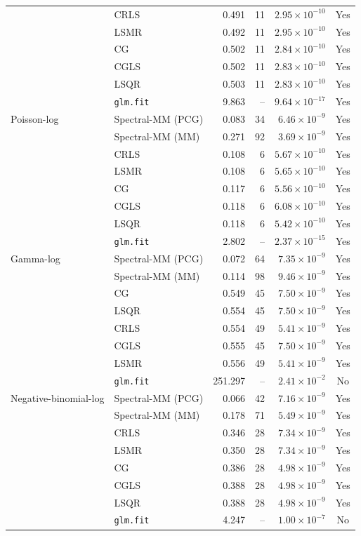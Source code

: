 \documentclass[10pt,a4paper]{article}
\begin{document}
\begin{longtable}{llrrrc}
 & CRLS & 0.491 & 11 & $2.95\times10^{-10}$ & Yes \\
 & LSMR & 0.492 & 11 & $2.95\times10^{-10}$ & Yes \\
 & CG & 0.502 & 11 & $2.84\times10^{-10}$ & Yes \\
 & CGLS & 0.502 & 11 & $2.83\times10^{-10}$ & Yes \\
 & LSQR & 0.503 & 11 & $2.83\times10^{-10}$ & Yes \\
 & \texttt{glm.fit} & 9.863 & -- & $9.64\times10^{-17}$ & Yes \\
\midrule
Poisson-log & Spectral-MM (PCG) & 0.083 & 34 & $6.46\times10^{-9}$ & Yes \\
 & Spectral-MM (MM) & 0.271 & 92 & $3.69\times10^{-9}$ & Yes \\
 & CRLS & 0.108 & 6 & $5.67\times10^{-10}$ & Yes \\
 & LSMR & 0.108 & 6 & $5.65\times10^{-10}$ & Yes \\
 & CG & 0.117 & 6 & $5.56\times10^{-10}$ & Yes \\
 & CGLS & 0.118 & 6 & $6.08\times10^{-10}$ & Yes \\
 & LSQR & 0.118 & 6 & $5.42\times10^{-10}$ & Yes \\
 & \texttt{glm.fit} & 2.802 & -- & $2.37\times10^{-15}$ & Yes \\
\midrule
Gamma-log & Spectral-MM (PCG) & 0.072 & 64 & $7.35\times10^{-9}$ & Yes \\
 & Spectral-MM (MM) & 0.114 & 98 & $9.46\times10^{-9}$ & Yes \\
 & CG & 0.549 & 45 & $7.50\times10^{-9}$ & Yes \\
 & LSQR & 0.554 & 45 & $7.50\times10^{-9}$ & Yes \\
 & CRLS & 0.554 & 49 & $5.41\times10^{-9}$ & Yes \\
 & CGLS & 0.555 & 45 & $7.50\times10^{-9}$ & Yes \\
 & LSMR & 0.556 & 49 & $5.41\times10^{-9}$ & Yes \\
 & \texttt{glm.fit} & 251.297 & -- & $2.41\times10^{-2}$ & No \\
\midrule
Negative-binomial-log & Spectral-MM (PCG) & 0.066 & 42 & $7.16\times10^{-9}$ & Yes \\
 & Spectral-MM (MM) & 0.178 & 71 & $5.49\times10^{-9}$ & Yes \\
 & CRLS & 0.346 & 28 & $7.34\times10^{-9}$ & Yes \\
 & LSMR & 0.350 & 28 & $7.34\times10^{-9}$ & Yes \\
 & CG & 0.386 & 28 & $4.98\times10^{-9}$ & Yes \\
 & CGLS & 0.388 & 28 & $4.98\times10^{-9}$ & Yes \\
 & LSQR & 0.388 & 28 & $4.98\times10^{-9}$ & Yes \\
 & \texttt{glm.fit} & 4.247 & -- & $1.00\times10^{-7}$ & No \\
\end{longtable}
\end{document}
